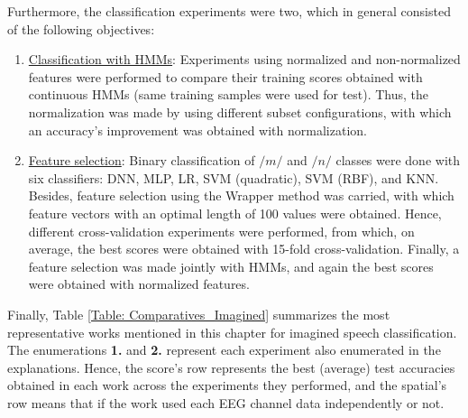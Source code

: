 Furthermore, the classification experiments were two, which in general consisted of the following objectives:
\begin{enumerate}
	\item \underline{Classification with HMMs}: Experiments using normalized and non-normalized features were performed to compare their training scores obtained with \linebreak[4]continuous HMMs (same training samples were used for test). Thus, the \linebreak[4]normalization was made by using different subset configurations, with which an accuracy's improvement was obtained with normalization.
	\item \underline{Feature selection}: Binary classification of $/m/$ and $/n/$ classes were done with six classifiers: DNN, MLP, LR, SVM (quadratic), SVM (RBF), and KNN. Besides, feature selection using the Wrapper method was carried, with which feature vectors with an optimal length of 100 values were obtained. Hence, different cross-validation experiments were performed, from which, on average, the best scores were obtained with 15-fold cross-validation. Finally, a feature selection was made jointly with HMMs, and again the best scores were obtained with normalized features.
\end{enumerate}

Finally, Table \ref{Table: Comparatives_Imagined} summarizes the most representative works mentioned in this chapter for imagined speech classification. The enumerations \textbf{1.} and \textbf{2.} represent each experiment also enumerated in the explanations. Hence, the score's row represents the best (average) test accuracies obtained in each work across the experiments they performed, and the spatial's row means that if the work used each EEG channel data independently or not.

